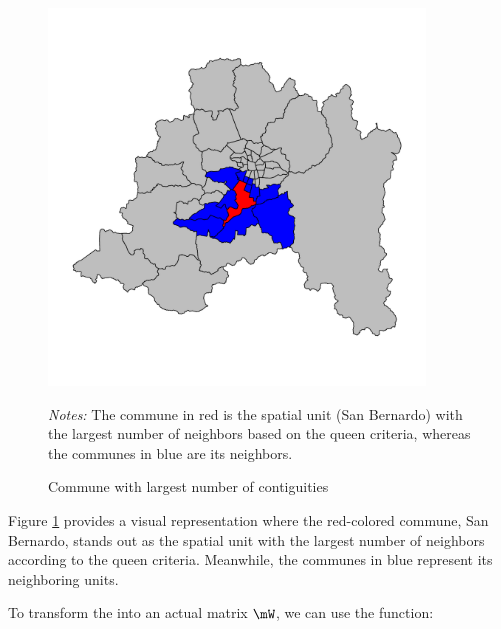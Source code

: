 \begin{figure}[ht]
  \caption{Commune with largest number of contiguities}
    \label{fig:plot_nn}
    \centering
        	\begin{minipage}{1\linewidth}
\begin{knitrout}
\color{fgcolor}

{\centering \includegraphics[width=10cm,height=10cm]{figure/neight-1} 

}


\end{knitrout}
\footnotesize
		\emph{Notes:} The commune in red is the spatial unit (San Bernardo) with the largest number of neighbors based on the queen criteria, whereas the communes in blue are its neighbors. 
	\end{minipage}	
\end{figure}

Figure \ref{fig:plot_nn} provides a visual representation where the red-colored commune, San Bernardo, stands out as the spatial unit with the largest number of neighbors according to the queen criteria. Meanwhile, the communes in blue represent its neighboring units.

To transform the  into an actual matrix $\mW$, we can use the  function:

